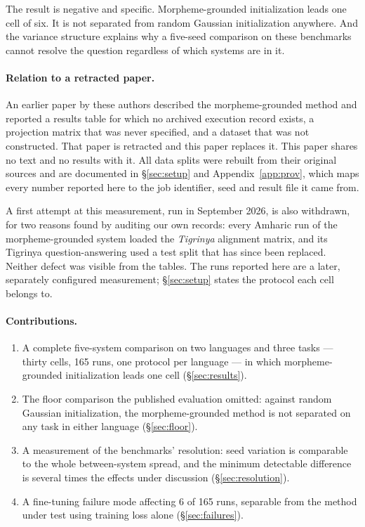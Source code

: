 \documentclass[11pt]{article}
\begin{document}
The result is negative and specific. Morpheme-grounded initialization leads
one cell of six. It is not separated from random Gaussian initialization
anywhere. And the variance structure explains why a five-seed comparison on
these benchmarks cannot resolve the question regardless of which systems are
in it.

\paragraph{Relation to a retracted paper.} An earlier paper by these authors
described the morpheme-grounded method and reported a results table for which
no archived execution record exists, a projection matrix that was never
specified, and a dataset that was not constructed. That paper
\citep{teklehaymanot-etal-2026-lgse} is retracted and this paper replaces it.
This paper shares no text and no results with it. All data splits were
rebuilt from their original sources and are documented in
\S\ref{sec:setup} and Appendix~\ref{app:prov}, which maps every number
reported here to the job identifier, seed and result file it came from.

A first attempt at this measurement, run in September 2026, is also
withdrawn, for two reasons found by auditing our own records: every Amharic
run of the morpheme-grounded system loaded the \emph{Tigrinya} alignment
matrix, and its Tigrinya question-answering used a test split that has since
been replaced. Neither defect was visible from the tables. The runs reported
here are a later, separately configured measurement; \S\ref{sec:setup} states
the protocol each cell belongs to.

\paragraph{Contributions.}
\begin{enumerate}
\itemsep0em
\item A complete five-system comparison on two languages and three tasks ---
  thirty cells, 165 runs, one protocol per language --- in which
  morpheme-grounded initialization leads one cell
  (\S\ref{sec:results}).
\item The floor comparison the published evaluation omitted: against random
  Gaussian initialization, the morpheme-grounded method is not separated on
  any task in either language (\S\ref{sec:floor}).
\item A measurement of the benchmarks' resolution: seed variation is
  comparable to the whole between-system spread, and the minimum detectable
  difference is several times the effects under discussion
  (\S\ref{sec:resolution}).
\item A fine-tuning failure mode affecting 6 of 165 runs, separable from the
  method under test using training loss alone (\S\ref{sec:failures}).
\end{enumerate}
\end{document}
